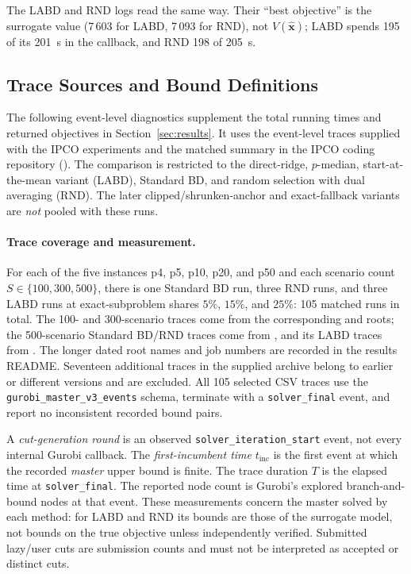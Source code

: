 The LABD and RND logs read the same way. Their ``best objective'' is the surrogate value (7\,603 for LABD, 7\,093 for RND), not $V(\widehat{\mathbf x})$; LABD spends 195 of its 201~s in the callback, and RND 198 of 205~s.

\subsection{Trace Sources and Bound Definitions}\label{app:trace-audit}


The following event-level diagnostics supplement the total running times and returned objectives in Section~\ref{sec:results}. It uses the event-level traces supplied with the IPCO experiments and the matched summary in the IPCO coding repository (). The comparison is restricted to the direct-ridge, $p$-median, start-at-the-mean variant  (LABD), Standard BD, and random selection with dual averaging (RND). The later clipped/shrunken-anchor and exact-fallback variants are \emph{not} pooled with these runs.

\paragraph{Trace coverage and measurement.}
For each of the five instances p4, p5, p10, p20, and p50 and each scenario count $S\in\{100,300,500\}$, there is one Standard BD run, three RND runs, and three LABD runs at exact-subproblem shares $5\%$, $15\%$, and $25\%$: 105 matched runs in total. The 100- and 300-scenario traces come from the corresponding  and  roots; the 500-scenario Standard BD/RND traces come from , and its LABD traces from . The longer dated root names and job numbers are recorded in the results README. Seventeen additional traces in the supplied archive belong to earlier or different versions and are excluded. All 105 selected CSV traces use the \texttt{gurobi\_master\_v3\_events} schema, terminate with a \texttt{solver\_final} event, and report no inconsistent recorded bound pairs.

A \emph{cut-generation round} is an observed \texttt{solver\_iteration\_start} event, not every internal Gurobi callback. The \emph{first-incumbent time} $t_{\mathrm{inc}}$ is the first event at which the recorded \emph{master} upper bound is finite. The trace duration $T$ is the elapsed time at \texttt{solver\_final}. The reported node count is Gurobi's explored branch-and-bound nodes at that event. These measurements concern the master solved by each method: for LABD and RND its bounds are those of the surrogate model, not bounds on the true objective unless independently verified. Submitted lazy/user cuts are submission counts and must not be interpreted as accepted or distinct cuts.



